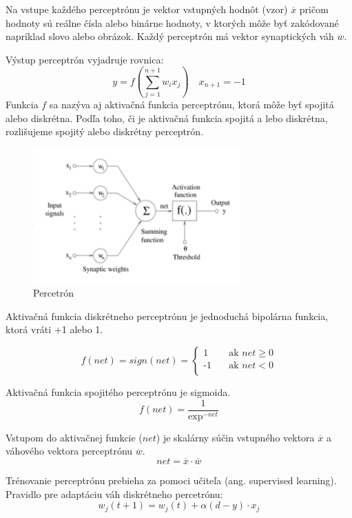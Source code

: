 Na vstupe každého perceptrónu je vektor vstupných hodnôt (vzor) $\overline{x}$ pričom hodnoty sú reálne čísla alebo binárne hodnoty, v ktorých môže byť zakódované
napríklad slovo alebo obrázok. Každý perceptrón má vektor synaptických váh $\overline{w}$. 

Výstup perceptrón vyjadruje rovnica:
\begin{equation}
	y = f (\sum_{j=1}^{n+1} w_{i} x_{j}) \quad x_{n+1} = -1
\end{equation}
Funkcia $f$ sa nazýva aj aktivačná funkcia perceptrónu, ktorá môže byť spojitá alebo diskrétna. 
Podľa toho, či je  aktivačná funkcia spojitá a lebo diskrétna, rozlišujeme spojitý alebo diskrétny
perceptrón.

\begin{figure}[H]
	\centering
	\includegraphics[width=8cm]{assets/perceptron}
	\caption{Percetrón}
\end{figure}

Aktivačná funkcia diskrétneho perceptrónu je jednoduchá bipolárna funkcia, ktorá vráti +1 alebo 1.

\[
f(net) = sign(net) =
     \begin{cases}
       \text{1} &\quad\text{ak } net \geq 0 \\
       \text{-1} &\quad\text{ak } net < 0 \\
     \end{cases}
\]


Aktivačná funkcia spojitého perceptrónu je sigmoida.
\begin{equation}
f(net) = \frac{1}{\exp^{-net}}  
\end{equation}

Vstupom do aktivačnej funkcie ($net$) je skalárny súčin vstupného vektora $\overline{x}$ a 
váhového vektora perceptrónu $\overline{w}$.
\begin{equation}
	net = \overline{x} \cdot \overline{w}
\end{equation}

Trénovanie perceptrónu prebieha za pomoci učiteľa (ang. supervised learning).
Pravidlo pre adaptáciu váh diskrétneho percetrónu:
\begin{equation}
	w_j(t+1) = w_j(t) + \alpha (d - y)\cdot x_j
\end{equation}

